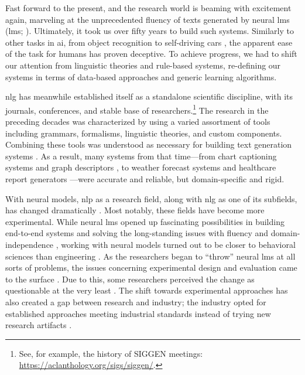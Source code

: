 Fast forward to the present, and the research world is beaming with excitement again, marveling at the unprecedented fluency of texts generated by neural \aclp{lm} (\acsp{lm}; \citealp{radford2019language,brown2020language}). Ultimately, it took us over fifty years to build such systems. Similarly to other tasks in \ac{ai}, from object recognition \cite{papert1966summer} to self-driving cars \cite{autonomouscars}, the apparent ease of the task for humans has proven deceptive.  To achieve progress, we had to shift our attention from linguistic theories and rule-based systems, re-defining our systems in terms of data-based approaches and generic learning algorithms.

\Ac{nlg} has meanwhile established itself as a standalone scientific discipline, with its journals, conferences, and stable base of researchers.\footnote{See, for example, the history of SIGGEN meetings: \url{https://aclanthology.org/sigs/siggen/}.} The research in the preceding decades was characterized by using a varied assortment of tools including grammars, formalisms, linguistic theories, and custom components. Combining these tools was understood as necessary for building text generation systems \cite{mann-1982-text,reiterBuildingAppliedNatural1997}. As a result, many systems from that time---from chart captioning systems \cite{mittalDescribingComplexCharts1998} and graph descriptors \cite{sunDomainIndependentSentence2006}, to weather forecast systems \cite{belzAutomaticGenerationWeather2008} and healthcare report generators \cite{portetAutomaticGenerationTextual2009}---were accurate and reliable, but domain-specific and rigid.


With neural models, \ac{nlp} as a research field, along with \ac{nlg} as one of its subfields, has changed dramatically \cite{gururaja2023build,li2023defining}. Most notably, these fields have become more experimental. While neural \acp{lm} opened up fascinating possibilities in building end-to-end systems and solving the long-standing issues with fluency and domain-independence \cite{ferreiraNeuralDatatotextGeneration2019,dusekEvaluatingStateoftheartEndtoEnd2020,sharmaInnovationsNeuralDatatotext2022}, working with neural models turned out to be closer to behavioral sciences than engineering \cite{holtzmanGenerativeModelsComplex2023}. As the researchers began to ``throw'' neural \acp{lm} at all sorts of problems, the issues concerning experimental design and evaluation came to the surface \cite{gehrmannRepairingCrackedFoundation2022}. Due to this, some researchers perceived the change as questionable at the very least \cite{reiter2020academic,gururaja2023build,michael2023nlp}. The shift towards experimental approaches has also created a gap between research and industry; the industry opted for established approaches meeting industrial standards instead of trying new research artifacts \cite{daleNaturalLanguageGeneration2020,daleNavigatingTextGeneration2023}.


